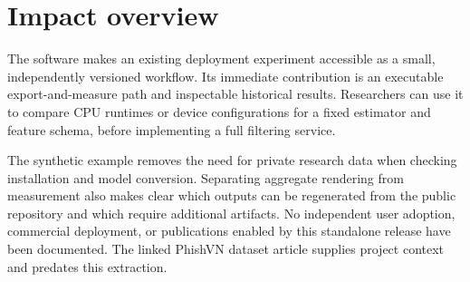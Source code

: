 \section{Impact overview}
The software makes an existing deployment experiment accessible as a small, independently versioned workflow. Its immediate contribution is an executable export-and-measure path and inspectable historical results. Researchers can use it to compare CPU runtimes or device configurations for a fixed estimator and feature schema, before implementing a full filtering service.

The synthetic example removes the need for private research data when checking installation and model conversion. Separating aggregate rendering from measurement also makes clear which outputs can be regenerated from the public repository and which require additional artifacts. No independent user adoption, commercial deployment, or publications enabled by this standalone release have been documented. The linked PhishVN dataset article supplies project context and predates this extraction.
